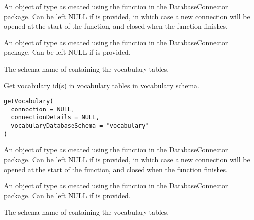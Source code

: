 \documentclass[a4paper]{book}
\begin{document}
\begin{Arguments}
\begin{ldescription}
\item[\code{connection}] An object of type  as created using the
 function in the
DatabaseConnector package. Can be left NULL if 
is provided, in which case a new connection will be opened at the start
of the function, and closed when the function finishes.

\item[\code{connectionDetails}] An object of type  as created using the
 function in the
DatabaseConnector package. Can be left NULL if  is
provided.

\item[\code{vocabularyDatabaseSchema}] The schema name of containing the vocabulary tables.
\end{ldescription}
\end{Arguments}
%
\begin{Description}\relax
Get vocabulary id(s) in vocabulary tables in vocabulary schema.
\end{Description}
%
\begin{Usage}
\begin{verbatim}
getVocabulary(
  connection = NULL,
  connectionDetails = NULL,
  vocabularyDatabaseSchema = "vocabulary"
)
\end{verbatim}
\end{Usage}
%
\begin{Arguments}
\begin{ldescription}
\item[\code{connection}] An object of type  as created using the
 function in the
DatabaseConnector package. Can be left NULL if 
is provided, in which case a new connection will be opened at the start
of the function, and closed when the function finishes.

\item[\code{connectionDetails}] An object of type  as created using the
 function in the
DatabaseConnector package. Can be left NULL if  is
provided.

\item[\code{vocabularyDatabaseSchema}] The schema name of containing the vocabulary tables.
\end{ldescription}
\end{Arguments}
\end{document}
